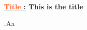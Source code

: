 \documentclass[a4paper, 12pt, twoside]{article}
\renewcommand{\emph}{\textcolor{ff4500}}
\newcommand{\ind}[1][20pt]{\advance\leftskip + #1}
\newcommand{\deind}[1][20pt]{\advance\leftskip - #1}
\newenvironment{indentedenv}[1][20pt]{\par \ind[#1]}{\par \deind}
\newenvironment{indt}[2][20pt]{#2 \begin{indentedenv}[#1]}{\end{indentedenv}} %
\newcommand{\thetitle}[2]{\begin{center}\textbf{{\LARGE \underline{\emph{#1} :}} {\Large #2}}\end{center}}
\newcommand{\mainpart}[2][$\!\!$]{\underline{\large \textbf{\emph{\textit{#1} #2}}}}
\newcommand{\subpart}[2][$\!\!$]{.\underline{\bf \textit{#1} #2}}
\newcommand{\subsubpart}[2][$\!\!$]{.\underline{\textsl{#1} #2}}
\newcommand{\subsubsubpart}[2][$\!\!$]{.\underline{\it #1 #2}}
\newcommand{\secpart}[1]{.\underline{\it #1 :}}
\newenvironment{mathdef}[2][20pt]{
    \secpart{#2} \begin{indentedenv}[#1]}
    {\end{indentedenv}}
\begin{document}
    \thetitle{Title}{This is the title}
    
    
%     
    
    
    .Aa
    
\end{document}
